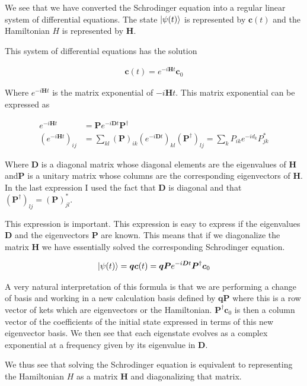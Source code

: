 \documentclass[12pt]{article}
\newcommand{\bv}[1]{\boldsymbol{#1}}
\begin{document}
We see that we have converted the Schrodinger equation into a regular linear system of differential equations. The state $\ket{\psi(t)}$ is represented by $\bv{c}(t)$ and the Hamiltonian $H$ is represented by $\bv{H}$.

This system of differential equations has the solution

\begin{align}
\bv{c}(t) = e^{-i\bv{H} t}\bv{c}_0 
\end{align}

Where $e^{-i\bv{H}t}$ is the matrix exponential of $-i\bv{H}t$. This matrix exponential can be expressed as

\begin{align}
e^{-i\bv{H}t} &= \bv{P}e^{-i\bv{D}t}\bv{P}^{\dag}\\
\left(e^{-i\bv{H}t}\right)_{ij} &= \sum_{kl} \left(\bv{P}\right)_{ik}\left(e^{-i\bv{D}t}\right)_{kl}\left(\bv{P}^{\dag}\right)_{lj} = \sum_k P_{ik} e^{-id_k} P^*_{jk}
\end{align}

Where $\bv{D}$ is a diagonal matrix whose diagonal elements are the eigenvalues of $\bv{H}$ and$\bv{P}$ is a unitary matrix whose columns are the corresponding eigenvectors of $\bv{H}$. In the last expression I used the fact that $\bv{D}$ is diagonal and that $\left(\bv{P}^{\dag} \right)_{lj} = \left(\bv{P}\right)^*_{jl}$.

This expression is important. This expression is easy to express if the eigenvalues $\bv{D}$ and the eigenvectors $\bv{P}$ are known. This means that if we diagonalize the matrix $\bv{H}$ we have essentially solved the corresponding Schrodinger equation.

\begin{align}
\ket{\psi(t)} = \bv{q}\bv{c}(t) = \bv{q}  \bv{P}e^{-i\bv{D}t}\bv{P}^{\dag}\bv{c}_0
\end{align}

A very natural interpretation of this formula is that we are performing a change of basis and working in a new calculation basis defined by $\bv{q}\bv{P}$ where this is a row vector of kets which are eigenvectors or the Hamiltonian. $\bv{P}^{\dag}\bv{c}_0$ is then a column vector of the coefficients of the initial state expressed in terms of this new eigenvector basis. We then see that each eigenstate evolves as a complex exponential at a frequency given by its eigenvalue in $\bv{D}$.

We thus see that solving the Schrodinger equation is equivalent to representing the Hamiltonian $H$ as a matrix $\bv{H}$ and diagonalizing that matrix.
\end{document}
